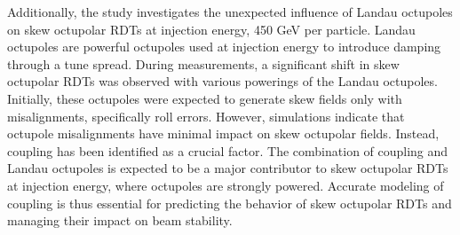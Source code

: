 {\indent
Additionally, the study investigates the unexpected influence of Landau octupoles on skew octupolar
RDTs at injection energy, 450 GeV per particle. Landau octupoles are powerful octupoles used at 
injection energy to introduce damping through a tune spread.  During measurements, a significant
shift in skew octupolar RDTs was observed with various powerings of the Landau octupoles. Initially,
these octupoles were expected to generate skew fields only with misalignments, specifically roll
errors.  However, simulations indicate that octupole misalignments have minimal impact on skew
octupolar fields. Instead, coupling has been identified as a crucial factor. The combination of
coupling and Landau octupoles is expected to be a major contributor to skew octupolar RDTs at
injection energy, where octupoles are strongly powered. Accurate modeling of coupling is thus
essential for predicting the behavior of skew octupolar RDTs and managing their impact on beam
stability.

}
